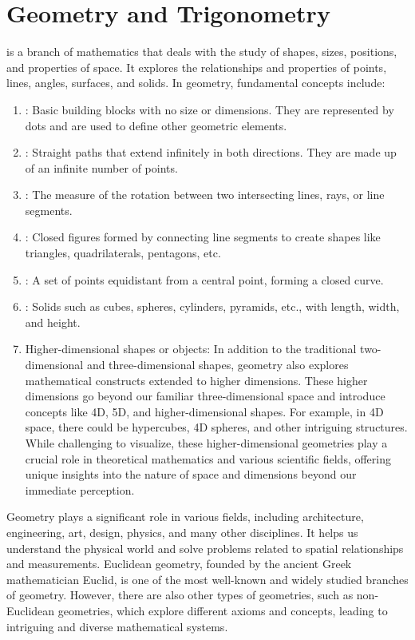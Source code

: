 \chapter{Geometry and Trigonometry}
\thispagestyle{fancy}

 is a branch of mathematics that deals with the study of shapes, sizes, positions, and properties of space. It explores the relationships and properties of points, lines, angles, surfaces, and solids. In geometry, fundamental concepts include:

\begin{enumerate}
	\item {}: Basic building blocks with no size or dimensions. They are represented by dots and are used to define other geometric elements.
	\item {}: Straight paths that extend infinitely in both directions. They are made up of an infinite number of points.
	\item {}: The measure of the rotation between two intersecting lines, rays, or line segments.
	\item {}: Closed figures formed by connecting line segments to create shapes like triangles, quadrilaterals, pentagons, etc.
	\item {}: A set of points equidistant from a central point, forming a closed curve.
	\item {}: Solids such as cubes, spheres, cylinders, pyramids, etc., with length, width, and height.
	\item Higher-dimensional shapes or objects: In addition to the traditional two-dimensional and three-dimensional shapes, geometry also explores mathematical constructs extended to higher dimensions. These higher dimensions go beyond our familiar three-dimensional space and introduce concepts like 4D, 5D, and higher-dimensional shapes. For example, in 4D space, there could be hypercubes, 4D spheres, and other intriguing structures. While challenging to visualize, these higher-dimensional geometries play a crucial role in theoretical mathematics and various scientific fields, offering unique insights into the nature of space and dimensions beyond our immediate perception.
\end{enumerate}

Geometry plays a significant role in various fields, including architecture, engineering, art, design, physics, and many other disciplines. It helps us understand the physical world and solve problems related to spatial relationships and measurements. Euclidean geometry, founded by the ancient Greek mathematician Euclid, is one of the most well-known and widely studied branches of geometry. However, there are also other types of geometries, such as non-Euclidean geometries, which explore different axioms and concepts, leading to intriguing and diverse mathematical systems.




